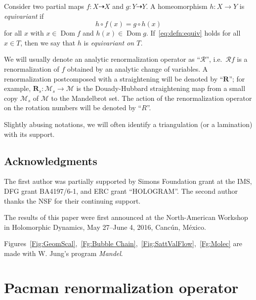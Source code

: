 \documentclass[]{amsart}
\newcommand{\Dom}{\operatorname {Dom}}
\newcommand\MM{\mathcal{M}}
\newcommand\RR{\mathcal{R}}
\newcommand\cRR{R}%
\newcommand\mRR{\boldsymbol R}%
\theoremstyle{remark}
\numberwithin{equation}{section}
\theoremstyle{definition}
\begin{document}
Consider two partial maps $f\colon  X\dashrightarrow X$ and $g\colon Y\dashrightarrow Y$. A  homeomorphism $h\colon X\to Y$ is \emph{equivariant} if 
\begin{equation}
\label{eq:defn:equiv}
 h\circ f(x)=g\circ h (x)
 \end{equation}
for all $x$ with $x\in \Dom f$ and $h(x)\in \Dom g$. If~\eqref{eq:defn:equiv} holds for all $x\in T$, then we say that $h$ is \emph{equivariant on $T$.} 

We will usually denote an analytic renormalization operator as ``$\RR$'', i.e.~$\RR f$ is a renormalization of $f$ obtained by an analytic change of variables. A renormalization postcomposed with a straightening will be denoted by ``$\mRR$''; for example, $\mRR_{s} \colon \MM_s\to \MM$ is the Douady-Hubbard straightening map from a small copy $\MM_s$ of $\MM$ to the Mandelbrot set. The action of the renormalization operator on the rotation numbers will be denoted by ``$\cRR$''.


Slightly abusing notations, we will often identify a triangulation (or a lamination) with its support.


\subsection*{Acknowledgments} The first author was partially supported by Simons Foundation grant at the IMS, DFG grant BA4197/6-1, and ERC grant ``HOLOGRAM''. The second author thanks the NSF for their continuing support. 


The results of this paper were first announced at the North-American Workshop in Holomorphic Dynamics, May 27--June 4, 2016, Canc\'un, M\'exico.

Figures~\ref{Fig:GeomScal},~\ref{Fg:Bubble Chain},~\ref{Fig:SattValFlow},~\ref{Fg:Molec} are made with W. Jung's program \emph{Mandel}.


\section{Pacman renormalization operator}
\label{sec:pacmen}
\end{document}
